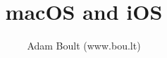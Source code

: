 \documentclass[oneside]{book}
\begin{document}
\author{Adam Boult (www.bou.lt)}
\title{macOS and iOS}
\maketitle

\setcounter{tocdepth}{0}
\tableofcontents


\end{document}
